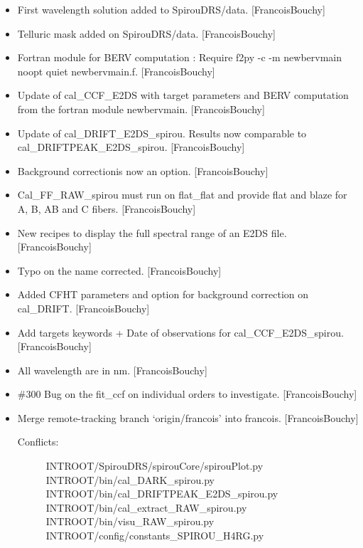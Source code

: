 \documentclass[a4paper,10pt,english]{report}
\begin{document}
\begin{itemize}
\item {} 
First wavelength solution added to SpirouDRS/data. {[}FrancoisBouchy{]}

\item {} 
Telluric mask added on SpirouDRS/data. {[}FrancoisBouchy{]}

\item {} 
Fortran module for BERV computation : Require f2py -c -m newbervmain
\textendash{}noopt \textendash{}quiet newbervmain.f. {[}FrancoisBouchy{]}

\item {} 
Update of cal\_CCF\_E2DS with target parameters and BERV computation
from the fortran module newbervmain. {[}FrancoisBouchy{]}

\item {} 
Update of cal\_DRIFT\_E2DS\_spirou. Results now comparable to
cal\_DRIFTPEAK\_E2DS\_spirou. {[}FrancoisBouchy{]}

\item {} 
Background correctionis now an option. {[}FrancoisBouchy{]}

\item {} 
Cal\_FF\_RAW\_spirou must run on flat\_flat and provide flat and blaze for
A, B, AB and C fibers. {[}FrancoisBouchy{]}

\item {} 
New recipes to display the full spectral range of an E2DS file.
{[}FrancoisBouchy{]}

\item {} 
Typo on the name corrected. {[}FrancoisBouchy{]}

\item {} 
Added CFHT parameters and option for background correction on
cal\_DRIFT. {[}FrancoisBouchy{]}

\item {} 
Add targets keywords + Date of observations for cal\_CCF\_E2DS\_spirou.
{[}FrancoisBouchy{]}

\item {} 
All wavelength are in nm. {[}FrancoisBouchy{]}

\item {} 
\#300 Bug on the fit\_ccf on individual orders to investigate.
{[}FrancoisBouchy{]}

\item {} 
Merge remote-tracking branch ‘origin/francois’ into francois.
{[}FrancoisBouchy{]}
\begin{description}
\item[{Conflicts:}] \leavevmode
INTROOT/SpirouDRS/spirouCore/spirouPlot.py
INTROOT/bin/cal\_DARK\_spirou.py
INTROOT/bin/cal\_DRIFTPEAK\_E2DS\_spirou.py
INTROOT/bin/cal\_extract\_RAW\_spirou.py
INTROOT/bin/visu\_RAW\_spirou.py
INTROOT/config/constants\_SPIROU\_H4RG.py


\end{description}
\end{itemize}
\end{document}
